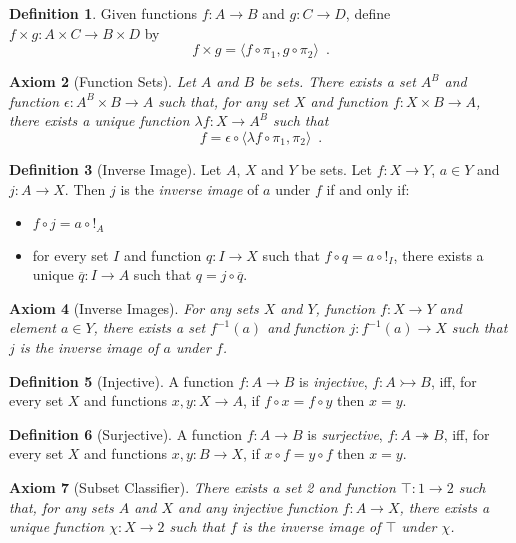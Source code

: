 \documentclass{book}
\newtheorem{ax}{Axiom}[chapter]
\theoremstyle{definition}
\newtheorem{df}[ax]{Definition}
\begin{document}
\begin{df}
Given functions $f : A \rightarrow B$ and $g : C \rightarrow D$, define $f \times g : A \times C \rightarrow B \times D$ by
\[ f \times g = \langle f \circ \pi_1, g \circ \pi_2 \rangle \enspace . \]
\end{df}

\begin{ax}[Function Sets]
Let $A$ and $B$ be sets. There exists a set $A^B$ and function $\epsilon : A^B \times B \rightarrow A$ such that, for any set $X$ and function $f : X \times B \rightarrow A$, there exists a unique function $\lambda f : X \rightarrow A^B$ such that
\[ f = \epsilon \circ \langle \lambda f \circ \pi_1, \pi_2 \rangle \enspace . \]
\end{ax}

\begin{df}[Inverse Image]
Let $A$, $X$ and $Y$ be sets. Let $f : X \rightarrow Y$, $a \in Y$ and $j : A \rightarrow X$. Then $j$ is the \emph{inverse image} of $a$ under $f$ if and only if:
\begin{itemize}
\item $f \circ j = a \circ !_A$
\item for every set $I$ and function $q : I \rightarrow X$ such that $f \circ q = a \circ !_I$, there exists a unique $\overline{q} : I \rightarrow A$ such that $q = j \circ \overline{q}$.
\end{itemize}
\end{df}

\begin{ax}[Inverse Images]
For any sets $X$ and $Y$, function $f : X \rightarrow Y$ and element $a \in Y$, there exists a set $f^{-1}(a)$ and function $j : f^{-1}(a) \rightarrow X$ such that $j$ is the inverse image of $a$ under $f$.
\end{ax}

\begin{df}[Injective]
A function $f : A \rightarrow B$ is \emph{injective}, $f : A \rightarrowtail B$, iff, for every set $X$ and functions $x,y : X \rightarrow A$, if $f \circ x = f \circ y$ then $x = y$.
\end{df}

\begin{df}[Surjective]
A function $f : A \rightarrow B$ is \emph{surjective}, $f : A \twoheadrightarrow B$, iff, for every set $X$ and functions $x,y : B \rightarrow X$, if $x \circ f = y \circ f$ then $x = y$.
\end{df}

\begin{ax}[Subset Classifier]
There exists a set 2 and function $\top : 1 \rightarrow 2$ such that, for any sets $A$ and $X$ and any injective function $f : A \rightarrow X$, there exists a unique function $\chi : X \rightarrow 2$ such that $f$ is the inverse image of $\top$ under $\chi$.
\end{ax}
\end{document}
